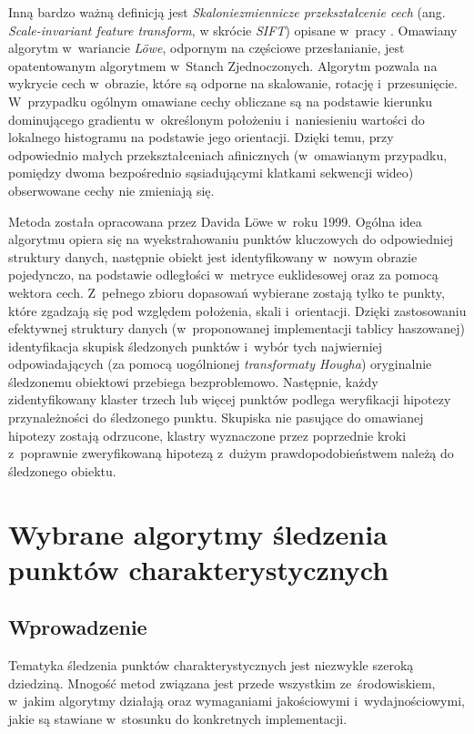     Inną bardzo ważną definicją jest \textit{Skaloniezmiennicze przekształcenie cech} (ang. \textit{Scale-invariant feature transform}, w skrócie \textit{SIFT}) opisane w~pracy \cite{SalientPointsTracking05}. Omawiany algorytm w~wariancie \textit{L\"{o}we}, odpornym na częściowe przesłanianie, jest opatentowanym algorytmem w~Stanch Zjednoczonych. Algorytm pozwala na wykrycie cech w~obrazie, które są odporne na skalowanie, rotację i~przesunięcie. W~przypadku ogólnym omawiane cechy obliczane są na podstawie kierunku dominującego gradientu w~określonym położeniu i~naniesieniu wartości do lokalnego histogramu na podstawie jego orientacji. Dzięki temu, przy odpowiednio małych przekształceniach afinicznych (w~omawianym przypadku, pomiędzy dwoma bezpośrednio sąsiadującymi klatkami sekwencji wideo) obserwowane cechy nie zmieniają się.

    Metoda została opracowana przez Davida L\"{o}we w~roku 1999. Ogólna idea algorytmu opiera się na wyekstrahowaniu punktów kluczowych do odpowiedniej struktury danych, następnie obiekt jest identyfikowany w~nowym obrazie pojedynczo, na podstawie odległości w~metryce euklidesowej oraz za pomocą wektora cech. Z~pełnego zbioru dopasowań wybierane zostają tylko te punkty, które zgadzają się pod względem położenia, skali i~orientacji. Dzięki zastosowaniu efektywnej struktury danych (w~proponowanej implementacji tablicy haszowanej) identyfikacja skupisk śledzonych punktów i~wybór tych najwierniej odpowiadających (za pomocą uogólnionej \textit{transformaty Hougha}) oryginalnie śledzonemu obiektowi przebiega bezproblemowo. Następnie, każdy zidentyfikowany klaster trzech lub więcej punktów podlega weryfikacji hipotezy przynależności do śledzonego punktu. Skupiska nie pasujące do omawianej hipotezy zostają odrzucone, klastry wyznaczone przez poprzednie kroki z~poprawnie zweryfikowaną hipotezą z~dużym prawdopodobieństwem należą do śledzonego obiektu.

\chapter{Wybrane algorytmy śledzenia punktów charakterystycznych}\label{Chapter_Algorytmy}

  \section{Wprowadzenie}\label{Section_IntroductionToAlgorithms}

    Tematyka śledzenia punktów charakterystycznych jest niezwykle szeroką dziedziną. Mnogość metod związana jest przede wszystkim ze~środowiskiem, w~jakim algorytmy działają oraz wymaganiami jakościowymi i~wydajnościowymi, jakie są stawiane w~stosunku do konkretnych implementacji.

